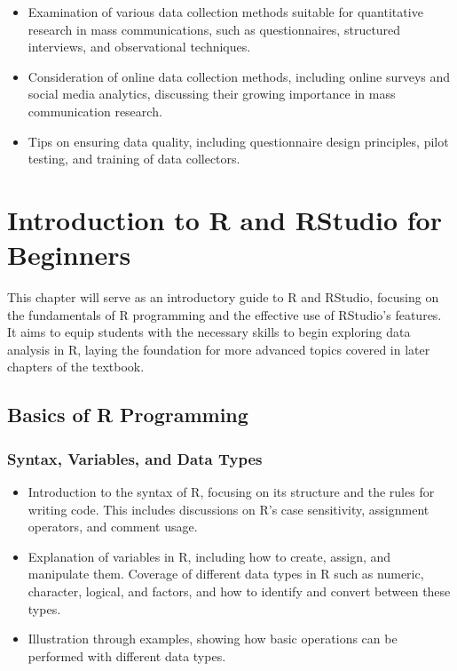 \documentclass[
]{book}
\begin{document}
\begin{itemize}
\item
  Examination of various data collection methods suitable for quantitative research in mass communications, such as questionnaires, structured interviews, and observational techniques.
\item
  Consideration of online data collection methods, including online surveys and social media analytics, discussing their growing importance in mass communication research.
\item
  Tips on ensuring data quality, including questionnaire design principles, pilot testing, and training of data collectors.
\end{itemize}

\hypertarget{introduction-to-r-and-rstudio-for-beginners}{%
\chapter*{Introduction to R and RStudio for Beginners}\label{introduction-to-r-and-rstudio-for-beginners}}

This chapter will serve as an introductory guide to R and RStudio, focusing on the fundamentals of R programming and the effective use of RStudio's features. It aims to equip students with the necessary skills to begin exploring data analysis in R, laying the foundation for more advanced topics covered in later chapters of the textbook.

\hypertarget{basics-of-r-programming}{%
\section*{Basics of R Programming}\label{basics-of-r-programming}}

\hypertarget{syntax-variables-and-data-types}{%
\subsection*{Syntax, Variables, and Data Types}\label{syntax-variables-and-data-types}}

\begin{itemize}
\item
  Introduction to the syntax of R, focusing on its structure and the rules for writing code. This includes discussions on R's case sensitivity, assignment operators, and comment usage.
\item
  Explanation of variables in R, including how to create, assign, and manipulate them. Coverage of different data types in R such as numeric, character, logical, and factors, and how to identify and convert between these types.
\item
  Illustration through examples, showing how basic operations can be performed with different data types.
\end{itemize}
\end{document}
